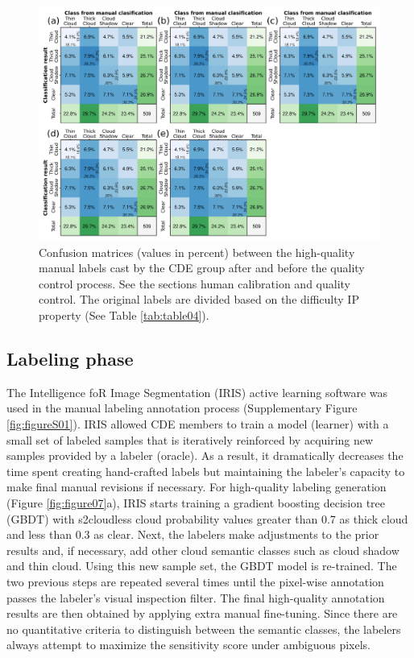 \documentclass[a4paper, nobind]{templates/cdethesis}
\begin{document}
\begin{figure}[!h]
    \centering
    \includegraphics[width=0.98\linewidth]{figures/chapter01/figure06.png}
    \caption{Confusion matrices (values in percent) between the high-quality manual labels cast by the CDE group after and before the quality control process. See the sections human calibration and quality control. The original labels are divided based on the difficulty IP property (See Table \ref{tab:table04}).}
    \label{fig:figure06}
\end{figure}

\hypertarget{labeling-phase}{%
\subsection{Labeling phase}\label{labeling-phase}}

The Intelligence foR Image Segmentation (IRIS) active learning software\cite{iris2019} was used in the manual labeling annotation process (Supplementary Figure \ref{fig:figureS01}). IRIS allowed CDE members to train a model (learner) with a small set of labeled samples that is iteratively reinforced by acquiring new samples provided by a labeler (oracle). As a result, it dramatically decreases the time spent creating hand-crafted labels but maintaining the labeler's capacity to make final manual revisions if necessary. For high-quality labeling generation (Figure \ref{fig:figure07}a), IRIS starts training a gradient boosting decision tree (GBDT) with s2cloudless cloud probability values greater than 0.7 as thick cloud and less than 0.3 as clear. Next, the labelers make adjustments to the prior results and, if necessary, add other cloud semantic classes such as cloud shadow and thin cloud. Using this new sample set, the GBDT model is re-trained. The two previous steps are repeated several times until the pixel-wise annotation passes the labeler's visual inspection filter. The final high-quality annotation results are then obtained by applying extra manual fine-tuning. Since there are no quantitative criteria to distinguish between the semantic classes, the labelers always attempt to maximize the sensitivity score under ambiguous pixels.
\end{document}
